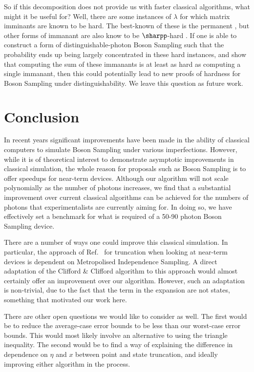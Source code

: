 So if this decomposition does not provide us with faster classical algorithms, what might it be useful for? Well, there are some instances of $\lambda$ for which matrix imminants are known to be hard. The best-known of these is the permanent \cite{valiant1979, aaronson2011}, but other forms of immanant are also know to be $\sharpp$-hard \cite{hartmann1985, burgisser2000, brylinski2003, mertens2013}. If one is able to construct a form of distinguishable-photon Boson Sampling such that the probability ends up being largely concentrated in these hard instances, and show that computing the sum of these immanants is at least as hard as computing a single immanant, then this could potentially lead to new proofs of hardness for Boson Sampling under distinguishability. We leave this question as future work.

\section{Conclusion}
\label{sec:conclusion}

In recent years significant improvements have been made in the ability of classical computers to simulate Boson Sampling under various imperfections. 
However, while it is of theoretical interest to demonstrate asymptotic improvements in classical simulation, the whole reason for proposals such as Boson Sampling is to offer speedups for near-term devices. 
Although our algorithm will not scale polynomially as the number of photons increases, we find that a substantial improvement over current classical algorithms can be achieved for the numbers of photons that experimentalists are currently aiming for. 
In doing so, we have effectively set a benchmark for what is required of a 50-90 photon Boson Sampling device.

There are a number of ways one could improve this classical simulation. 
In particular, the approach of Ref.~\cite{renema2018} for truncation when looking at near-term devices is dependent on Metropolised Independence Sampling. 
A direct adaptation of the Clifford \& Clifford algorithm to this approach would almost certainly offer an improvement over our algorithm. 
However, such an adaptation is non-trivial, due to the fact that the term in the expansion are not states, something that motivated our work here.

There are other open questions we would like to consider as well. The first would be to reduce the average-case error bounds to be less than our worst-case error bounds. This would most likely involve an alternative to using the triangle inequality. The second would be to find a way of explaining the difference in dependence on $\eta$ and $x$ between point and state truncation, and ideally improving either algorithm in the process.


